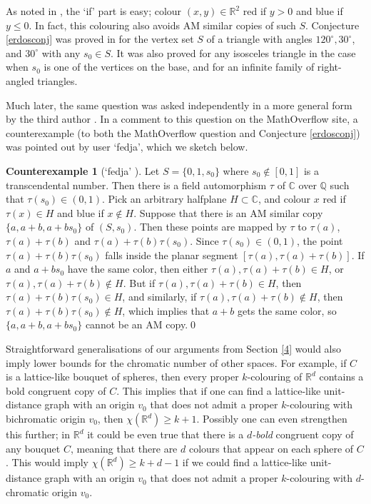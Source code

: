 \documentclass[12pt]{article}
\newcommand{\R}{{\mathbb R}}
\newcommand{\Q}{{\mathbb Q}}
\theoremstyle{plain}
\theoremstyle{definition}
\newtheorem*{counterexample}{Counterexample}
\begin{document}
As noted in \cite{EGMRSS3}, the `if' part is easy; colour  $(x,y)\in\R^2$ red if $y>0$ and blue if $y\le 0$.
In fact, this colouring also avoids AM similar copies of such $S$.
Conjecture \ref{erdosconj} was proved in \cite{EGMRSS3} for the vertex set $S$ of a triangle with angles $120^\circ, 30^{\circ}$, and $30^{\circ}$ with any $s_0\in S$. It was also proved for any isosceles triangle in the case when $s_0$ is one of the vertices on the base, and for an infinite family of right-angled triangles.

Much later, the same question was asked independently in a more general form by the third author \cite{domotor2}.
In a comment to this question on the MathOverflow site, a counterexample (to both the MathOverflow question and Conjecture \ref{erdosconj}) was pointed out by user `fedja', which we sketch below.

\begin{counterexample}[`fedja' \cite{fedja}]
Let $S=\{0,1,s_0\}$ where $s_0\notin [0,1]$ is a transcendental number.
Then there is a field automorphism $\tau$ of $\mathbb C$ over $\Q$ such that $\tau(s_0)\in(0,1)$.
Pick an arbitrary halfplane $H\subset \mathbb C$, and colour $x$ red if $\tau(x)\in H$ and blue if $x\notin H$.
Suppose that there is an AM similar copy $\{a,a+b,a+bs_0\}$ of $(S,s_0)$.
Then these points are mapped by $\tau$ to $\tau(a)$, $\tau(a)+\tau(b)$ and $\tau(a)+\tau(b)\tau(s_0)$.
Since $\tau(s_0)\in(0,1)$, the point $\tau(a)+\tau(b)\tau(s_0)$ falls inside the planar segment $[\tau(a),\tau(a)+\tau(b)]$.
If $a$ and $a+bs_0$ have the same color, then either $\tau(a),\tau(a)+\tau(b)\in H$, or $\tau(a),\tau(a)+\tau(b)\notin H$.
But if $\tau(a),\tau(a)+\tau(b)\in H$, then $\tau(a)+\tau(b)\tau(s_0)\in H$, and similarly, if $\tau(a),\tau(a)+\tau(b)\notin H$, then $\tau(a)+\tau(b)\tau(s_0)\notin H$, which implies that $a+b$ gets the same color, 
so $\{a,a+b,a+bs_0\}$ cannot be an AM copy.\qed
\end{counterexample}

\bigskip



Straightforward generalisations of our arguments from Section \ref{4} would also imply lower bounds for the chromatic number of other spaces.
For example, if $C$ is a lattice-like bouquet of spheres, then every proper $k$-colouring of $\mathbb R^d$ contains a bold congruent copy of $C$. This implies that if one can find a lattice-like unit-distance graph with an origin $v_0$ that does not admit a proper $k$-colouring with bichromatic origin $v_0$, then $\chi(\mathbb R^d)\ge k+1$.
Possibly one can even strengthen this further; in $\mathbb R^d$ it could be even true that there is a \emph{$d$-bold} congruent copy of any bouquet $C$, meaning that there are $d$ colours that appear on each sphere of $C$.
This would imply $\chi(\mathbb R^d)\ge k+d-1$ if we could find a lattice-like unit-distance graph with an origin $v_0$ that does not admit a proper $k$-colouring with $d$-chromatic origin $v_0$.
\end{document}
